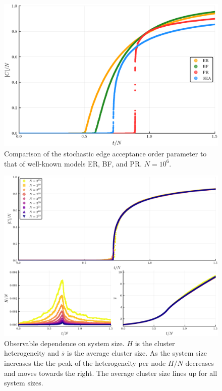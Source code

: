 \begin{figure}[H]
	\centering
	\includegraphics[width=350pt, clip]{images/Network_ER_BF_PR_SEA_1e6_order_param.png}
	\caption{Comparison of the stochastic edge acceptance order parameter to that of well-known models ER, BF, and PR. $N = 10^6$.}
	\label{fig:ER_BF_PR_SEA_transition}
\end{figure}

\begin{figure}[H]
	\centering
	\includegraphics[width=350pt, clip]{images/k_scaling_triple.png}
	\caption{Observable dependence on system size. $H$ is the cluster heterogeneity and $\overline{s}$ is the average cluster size. As the system size increases the the peak of the heterogeneity per node $H/N$ decreases and moves towards the right. The average cluster size lines up for all system sizes.}
	\label{fig:k_scaling_triple}
\end{figure}

